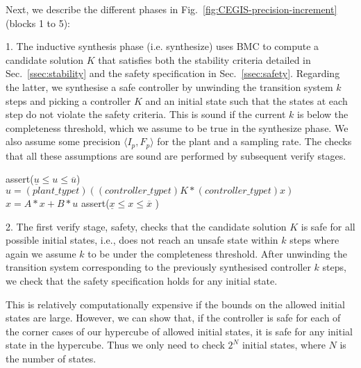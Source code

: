 \documentclass[runningheads,a4paper]{llncs}
\begin{document}
\medskip

Next, we describe the different phases in Fig.~\ref{fig:CEGIS-precision-increment}
(blocks 1 to 5):


1. The inductive synthesis phase (i.e. {\sc synthesize}) uses BMC to
compute a candidate solution $K$
that satisfies both the stability criteria detailed in 
Sec.~\ref{ssec:stability} and the safety specification in Sec.~\ref{ssec:safety}.
Regarding the latter, we synthesise a safe controller by unwinding the transition system
$k$ steps and picking a controller $K$ and an initial state such that the states at each step do
not violate the safety criteria. This is sound if the current $k$ is below the
completeness threshold, which we assume to be true in the {\sc synthesize} phase.
We also assume some
precision $\langle I_p,F_p\rangle$ for the plant and a sampling rate.  The
checks that all these assumptions are sound are performed by subsequent
{\sc verify} stages.



\begin{algorithm}[]
\begin{algorithmic}[1]
	\State assert($ \underline{u}  \leq u \leq \overline{u}$)
		\State $u = (plant\_typet)((controller\_typet)K * (controller\_typet) x)$
		\State $x = A * x + B * u$
		\State assert($\underline{x} \leq x \leq \overline{x}$ )
  	\EndWhile
\EndFunction
\end{algorithmic}
\label{alg:safetycheck}
\end{algorithm}

2. The first {\sc verify} stage, {\sc safety}, checks that the candidate
solution $K$ is safe for all possible initial states, i.e., does not reach an unsafe
state within $k$ steps where again we assume $k$ to be under the completeness threshold. 
After unwinding the transition system corresponding to the previously synthesised controller
$k$ steps, we check that the safety specification holds for any initial state. 

This is relatively computationally expensive if the bounds on the
allowed initial states are large.  However, we can show that, if the
controller is safe for each of the corner cases of our hypercube of
allowed initial states, it is safe for any initial state in the
hypercube. Thus we only need to check $2^N$ initial states, where $N$
is the number of states.
\end{document}
